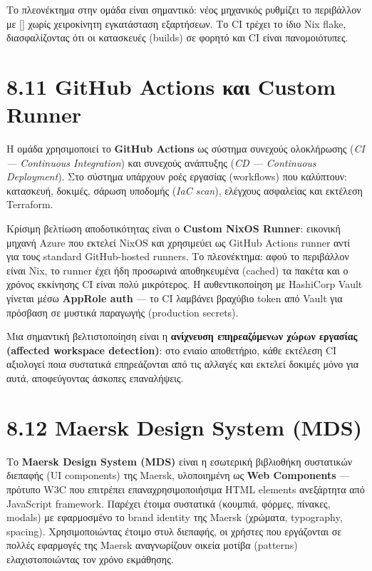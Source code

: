 \documentclass[11pt,a4paper,greek,twoside]{template-xe}
\let\origtexttt\texttt
\renewcommand{\texttt}[1]{%
  \begingroup
  \StrSubstitute{#1}{.}{.\allowbreak}[\tttmp]%
  \origtexttt{\tttmp}%
  \endgroup
}
\begin{document}
Το πλεονέκτημα στην ομάδα είναι σημαντικό: νέος μηχανικός ρυθμίζει το
περιβάλλον με \texttt{nix\ develop} χωρίς χειροκίνητη εγκατάσταση
εξαρτήσεων. Το CI τρέχει το ίδιο Nix flake, διασφαλίζοντας ότι οι
κατασκευές (builds) σε φορητό και CI είναι πανομοιότυπες.

\section{8.11 GitHub Actions και Custom
Runner}\label{github-actions-ux3baux3b1ux3b9-custom-runner}

Η ομάδα χρησιμοποιεί το \textbf{GitHub Actions} ως σύστημα συνεχούς
ολοκλήρωσης (\emph{CI --- Continuous Integration}) και συνεχούς
ανάπτυξης (\emph{CD --- Continuous Deployment}). Στο σύστημα υπάρχουν
ροές εργασίας (workflows) που καλύπτουν: κατασκευή, δοκιμές, σάρωση
υποδομής (\emph{IaC scan}), ελέγχους ασφαλείας και εκτέλεση Terraform.

Κρίσιμη βελτίωση αποδοτικότητας είναι ο \textbf{Custom NixOS Runner}:
εικονική μηχανή Azure που εκτελεί NixOS και χρησιμεύει ως GitHub Actions
runner αντί για τους standard GitHub-hosted runners. Το πλεονέκτημα:
αφού το περιβάλλον είναι Nix, το runner έχει ήδη προσωρινά αποθηκευμένα
(cached) τα πακέτα και ο χρόνος εκκίνησης CI είναι πολύ μικρότερος. Η
αυθεντικοποίηση με HashiCorp Vault γίνεται μέσω \textbf{AppRole auth}
--- το CI λαμβάνει βραχύβιο token από Vault για πρόσβαση σε μυστικά
παραγωγής (production secrets).

Μια σημαντική βελτιστοποίηση είναι η \textbf{ανίχνευση επηρεαζόμενων
χώρων εργασίας (affected workspace detection)}: στο ενιαίο αποθετήριο,
κάθε εκτέλεση CI αξιολογεί ποια συστατικά επηρεάζονται από τις αλλαγές
και εκτελεί δοκιμές μόνο για αυτά, αποφεύγοντας άσκοπες επαναλήψεις.

\section{8.12 Maersk Design System
(MDS)}\label{maersk-design-system-mds}

Το \textbf{Maersk Design System (MDS)} είναι η εσωτερική βιβλιοθήκη
συστατικών διεπαφής (UI components) της Maersk, υλοποιημένη ως
\textbf{Web Components} --- πρότυπο W3C που επιτρέπει
επαναχρησιμοποιήσιμα HTML elements ανεξάρτητα από JavaScript framework.
Παρέχει έτοιμα συστατικά (κουμπιά, φόρμες, πίνακες, modals) με
εφαρμοσμένο το brand identity της Maersk (χρώματα, typography, spacing).
Χρησιμοποιώντας έτοιμο στυλ διεπαφής, οι χρήστες που εργάζονται σε
πολλές εφαρμογές της Maersk αναγνωρίζουν οικεία μοτίβα (patterns)
ελαχιστοποιώντας τον χρόνο εκμάθησης.
\end{document}

